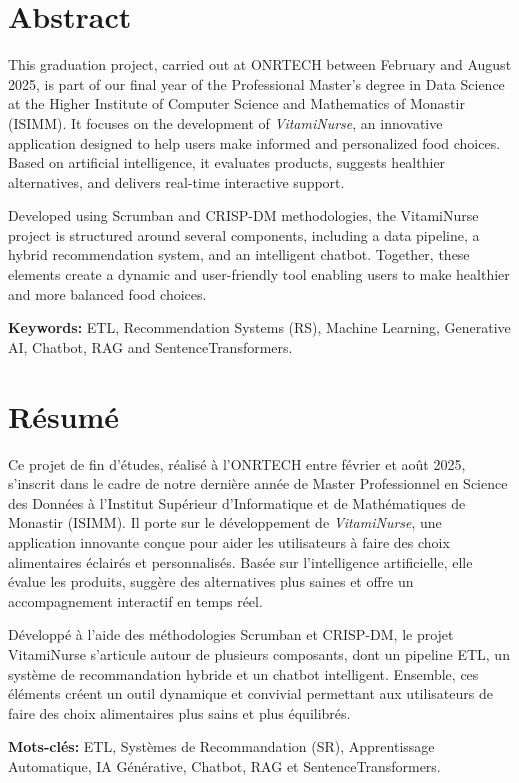 \chapter*{Abstract}

This graduation project, carried out at ONRTECH between February and August 2025, is part of our final year of the Professional Master’s degree in Data Science at the Higher Institute of Computer Science and Mathematics of Monastir (ISIMM). It focuses on the development of \textit{VitamiNurse}, an innovative application designed to help users make informed and personalized food choices. Based on artificial intelligence, it evaluates products, suggests healthier alternatives, and delivers real-time interactive support.

Developed using Scrumban and CRISP-DM methodologies, the VitamiNurse project is structured around several components, including a data pipeline, a hybrid recommendation system, and an intelligent chatbot. Together, these elements create a dynamic and user-friendly tool enabling users to make healthier and more balanced food choices.

\noindent\textbf{Keywords:} ETL, Recommendation Systems (RS), Machine Learning, Generative AI, Chatbot, RAG and SentenceTransformers.

\newpage
\chapter*{Résumé}
Ce projet de fin d’études, réalisé à l’ONRTECH entre février et août 2025, s’inscrit dans le cadre de notre dernière année de Master Professionnel en Science des Données à l’Institut Supérieur d’Informatique et de Mathématiques de Monastir (ISIMM). Il porte sur le développement de \textit{VitamiNurse}, une application innovante conçue pour aider les utilisateurs à faire des choix alimentaires éclairés et personnalisés. Basée sur l’intelligence artificielle, elle évalue les produits, suggère des alternatives plus saines et offre un accompagnement interactif en temps réel.

Développé à l’aide des méthodologies Scrumban et CRISP-DM, le projet VitamiNurse s’articule autour de plusieurs composants, dont un pipeline ETL, un système de recommandation hybride et un chatbot intelligent. Ensemble, ces éléments créent un outil dynamique et convivial permettant aux utilisateurs de faire des choix alimentaires plus sains et plus équilibrés.

\noindent\textbf{Mots-clés:} ETL, Systèmes de Recommandation (SR), Apprentissage Automatique, IA Générative, Chatbot, RAG et SentenceTransformers.